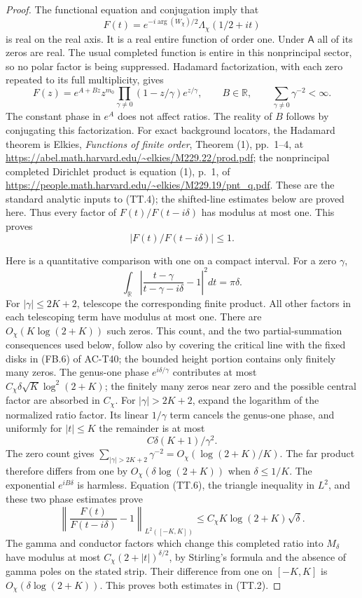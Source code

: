 \begin{proof}
The functional equation and conjugation imply that
\[
        F(t)=e^{-i\arg(W_\chi)/2}
                     \Lambda_\chi(1/2+it)
 \]
is real on the real axis.  It is a real entire function of
order one.  Under \(\mathsf A\) all of its zeros are real.
The usual completed function is entire in this nonprincipal
sector, so no polar factor is being suppressed.
Hadamard factorization, with each zero repeated to its full
multiplicity, gives
\[
 F(z)=e^{A+Bz}z^{m_0}
       \prod_{\gamma\ne0}(1-z/\gamma)e^{z/\gamma},
       \qquad B\in\mathbb R,\qquad
                   \sum_{\gamma\ne0}\gamma^{-2}<\infty.
 \tag{TT.4}
\]
The constant phase in \(e^A\) does not affect ratios.
The reality of \(B\) follows by conjugating this factorization.
For exact background locators, the Hadamard theorem is
Elkies, \emph{Functions of finite order}, Theorem (1),
pp.~1--4, at
\url{https://abel.math.harvard.edu/~elkies/M229.22/prod.pdf};
the nonprincipal completed Dirichlet product is equation (1),
p.~1, of
\url{https://people.math.harvard.edu/~elkies/M229.19/pnt_q.pdf}.
These are the standard analytic inputs to (TT.4); the
shifted-line estimates below are proved here.
Thus every factor of \(F(t)/F(t-i\delta)\) has modulus at
most one.  This proves
\[
                 |F(t)/F(t-i\delta)|\leq1.
 \tag{TT.5}
\]

Here is a quantitative comparison with one on a compact
interval.  For a zero \(\gamma\),
\[
 \int_{\mathbb R}
   \left|\frac{t-\gamma}{t-\gamma-i\delta}-1\right|^2dt
                         =\pi\delta .
 \tag{TT.6}
\]
For \(|\gamma|\leq2K+2\), telescope the corresponding
finite product.  All other factors in each telescoping
term have modulus at most one.
There are \(O_\chi(K\log(2+K))\) such zeros.
This count, and the two partial-summation consequences
used below, follow also by covering the critical line
with the fixed disks in (FB.6) of AC-T40; the bounded
height portion contains only finitely many zeros.
The genus-one phase \(e^{i\delta/\gamma}\) contributes at
most
\(C_\chi\delta\sqrt K\log^2(2+K)\);
the finitely many zeros near zero and the possible central
factor are absorbed in \(C_\chi\).
For \(|\gamma|>2K+2\), expand the logarithm of the
normalized ratio factor.  Its linear \(1/\gamma\) term
cancels the genus-one phase, and uniformly for \(|t|\leq K\)
the remainder is at most
\[
                     C\delta(K+1)/\gamma^2.
 \]
The zero count gives
\(\sum_{|\gamma|>2K+2}\gamma^{-2}
       =O_\chi(\log(2+K)/K)\).
The far product therefore differs from one by
\(O_\chi(\delta\log(2+K))\) when \(\delta\leq1/K\).
The exponential \(e^{iB\delta}\) is harmless.
Equation (TT.6), the triangle inequality in \(L^2\), and
these two phase estimates prove
\[
 \left\|\frac{F(t)}{F(t-i\delta)}-1\right\|_{L^2([-K,K])}
               \leq C_\chi K\log(2+K)\sqrt\delta .
 \]
The gamma and conductor factors which change this completed
ratio into \(M_\delta\) have modulus at most
\(C_\chi(2+|t|)^{\delta/2}\), by Stirling's formula and
the absence of gamma poles on the stated strip.
Their difference from one on \([-K,K]\) is
\(O_\chi(\delta\log(2+K))\).
This proves both estimates in (TT.2).


\end{proof}
